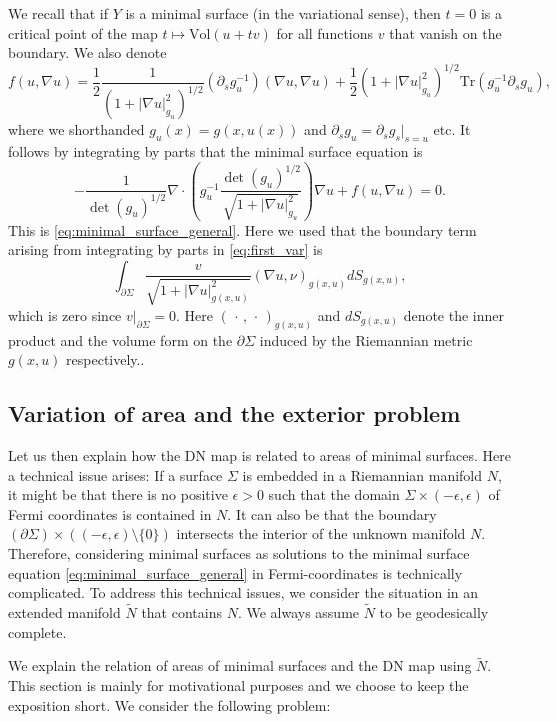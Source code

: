 \documentclass[12pt]{amsart}
\def\p{\partial}
\theoremstyle{definition}
\theoremstyle{remark}
\newcommand{\abs}[1]{\lvert #1 \rvert}
\newcommand{\eps}{\epsilon}
\newcommand{\ccdot}{\,\cdot\,}
\begin{document}
We recall that if $Y$ is a minimal surface (in the variational sense), then $t = 0$ is a critical point of the map $t \mapsto \text{Vol}(u + tv)$ for all functions $v$ that vanish on the boundary. We also denote 
\[
 f(u,\nabla u)=\frac{1}{2}\frac{1}{(1+\abs{\nabla u}^2_{g_u})^{1/2}}(\p_sg_u^{-1})(\nabla u,\nabla u)+\frac{1}{2}(1+\abs{\nabla u}^2_{g_u})^{1/2}\text{Tr}(g_u^{-1}\p_sg_u),
\]
where we shorthanded $g_u(x)=g(x,u(x))$ and $\p_sg_u=\p_sg_s|_{s=u}$ etc.
It follows by integrating by parts that the minimal surface equation is
\begin{equation*}
 -\frac{1}{\det(g_u)^{1/2}}\nabla\cdot \left( g_u^{-1}\frac{\det(g_u)^{1/2}}{\sqrt{1+\abs{\nabla u}^2_{g_u}}} \right)\nabla u + f(u,\nabla u) =0. 
\end{equation*}
This is \eqref{eq:minimal_surface_general}. Here we used that the boundary term arising from integrating by parts in \eqref{eq:first_var} is
\begin{equation}\label{eq:boundary_term}
 \int_{\p \Sigma} \frac{v}{\sqrt{1+\abs{\nabla u}^2_{g(x,u)}}}(\nabla u, \nu)_{g(x,u)}dS_{g(x,u)},
\end{equation}
which is zero since $v|_{\p \Sigma}=0$. Here $(\ccdot,\ccdot)_{g(x,u)}$ and $dS_{g(x,u)}$ denote the  inner product and the volume form on the $\p\Sigma$ induced by the Riemannian metric $g(x,u)$ respectively..



\subsection{Variation of area and the exterior problem}\label{sec:areas_exterior_problem}
Let us then explain how the DN map is related to areas of minimal surfaces. Here a technical issue arises: If a surface $\Sigma$ is embedded in a Riemannian manifold $N$, it might be that there is no positive $\eps >0$ such that the domain $\Sigma \times (-\eps,\eps)$ of Fermi coordinates is contained in $N$. It can also be that the boundary $(\partial \Sigma) \times ((-\eps,\eps)\setminus \{0\})$ intersects the interior of the unknown manifold $N$. Therefore, considering minimal surfaces as solutions to the
minimal surface equation \eqref{eq:minimal_surface_general} in Fermi-coordinates is technically complicated. To
address this technical issues, we consider the situation in an extended manifold $\widetilde N$ that contains $N$. We always assume $\widetilde N$ to be geodesically complete. 

We explain the relation of areas of minimal surfaces and the DN map using $\widetilde N$. This section is mainly for motivational purposes and we choose to keep the exposition short. We consider the following problem:
% 
% 
% 
% 
\end{document}
